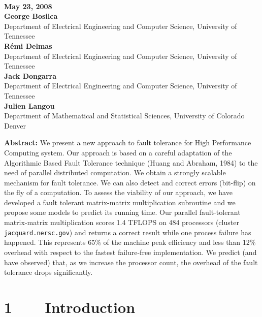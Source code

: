 \documentclass[pdftex,11pt]{article}
\begin{document}
\\

\noindent \textbf{\color{DodgerBlue4} May 23, 2008}\\

\noindent
\textbf{\color{DodgerBlue4}George Bosilca}\\
Department of Electrical Engineering and Computer Science, University of Tennessee\\
\textbf{\color{DodgerBlue4}R\'emi Delmas}\\
Department of Electrical Engineering and Computer Science, University of Tennessee\\
\textbf{\color{DodgerBlue4}Jack Dongarra}\\
Department of Electrical Engineering and Computer Science, University of Tennessee\\
\textbf{\color{DodgerBlue4}Julien Langou}\\
Department of Mathematical and Statistical Sciences, University of Colorado Denver\\

\begin{center}
\begin{minipage}{14cm}
\noindent\textbf{\color{DodgerBlue4}Abstract:} {\small
We present a new approach to fault tolerance for High Performance Computing
system.  Our approach is based on a careful adaptation of the Algorithmic Based
Fault Tolerance technique (Huang and Abraham, 1984) to the need of parallel
distributed computation.  We obtain a strongly scalable mechanism
for fault tolerance.  We can also detect and correct errors (bit-flip) on the fly
of a computation.  To assess the viability of our approach, we have developed
a fault tolerant matrix-matrix multiplication subroutine and we propose some
models to predict its running time.  Our parallel fault-tolerant
matrix-matrix multiplication scores 1.4 TFLOPS on 484 processors (cluster
\texttt{jacquard.nersc.gov}) and returns a correct result while one process
failure has happened. This represents 65\% of the machine peak efficiency and
less than 12\% overhead with respect to the fastest failure-free
implementation. We predict (and have observed) that, as we increase the
processor count, the overhead of the fault tolerance drops significantly.
}
\end{minipage}
\end{center}

\section*{\color{DodgerBlue4}1~~~~Introduction}
\end{document}
